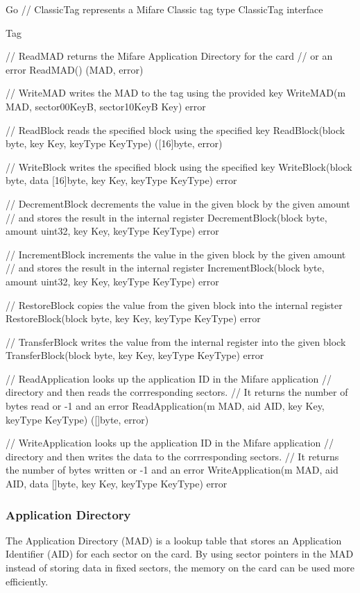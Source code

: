 \documentclass[dissertation.tex]{subfiles}
\begin{document}
  \begin{code}[numbers=none]{Go}
    // ClassicTag represents a Mifare Classic tag
    type ClassicTag interface {
    	Tag

    	// ReadMAD returns the Mifare Application Directory for the card
    	// or an error
    	ReadMAD() (MAD, error)

    	// WriteMAD writes the MAD to the tag using the provided key
    	WriteMAD(m MAD, sector00KeyB, sector10KeyB Key) error

    	// ReadBlock reads the specified block using the specified key
    	ReadBlock(block byte, key Key, keyType KeyType) ([16]byte, error)

    	// WriteBlock writes the specified block using the specified key
    	WriteBlock(block byte, data [16]byte, key Key, keyType KeyType) error

    	// DecrementBlock decrements the value in the given block by the given amount
    	// and stores the result in the internal register
    	DecrementBlock(block byte, amount uint32, key Key, keyType KeyType) error

    	// IncrementBlock increments the value in the given block by the given amount
    	// and stores the result in the internal register
    	IncrementBlock(block byte, amount uint32, key Key, keyType KeyType) error

    	// RestoreBlock copies the value from the given block into the internal register
    	RestoreBlock(block byte, key Key, keyType KeyType) error

    	// TransferBlock writes the value from the internal register into the given block
    	TransferBlock(block byte, key Key, keyType KeyType) error

    	// ReadApplication looks up the application ID in the Mifare application
    	// directory and then reads the corrresponding sectors.
    	// It returns the number of bytes read or -1 and an error
    	ReadApplication(m MAD, aid AID, key Key, keyType KeyType) ([]byte, error)

    	// WriteApplication looks up the application ID in the Mifare application
    	// directory and then writes the data to the corrresponding sectors.
    	// It returns the number of bytes written or -1 and an error
    	WriteApplication(m MAD, aid AID, data []byte, key Key, keyType KeyType) error
    }
  \end{code}


  \subsubsection{\mifare{} Application Directory}\label{sec:mad}
  The \mifare{} Application Directory (MAD) is a lookup table that stores an Application Identifier (AID) for each sector on the card. By using sector pointers in the MAD instead of storing data in fixed sectors, the memory on the card can be used more efficiently.
\end{document}
